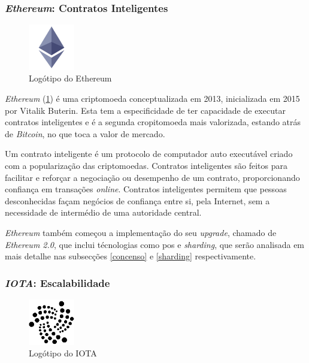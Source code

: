 \subsubsection{\textit{Ethereum}: Contratos Inteligentes}
\begin{figure}
    \includegraphics[width=2cm]{images/ethereum.png}
    \caption{Logótipo do Ethereum}
    \label{fig:ethereum-logo}
\end{figure}

\textit{Ethereum} (\cref{fig:ethereum-logo}) é uma criptomoeda conceptualizada em 2013, inicializada em 2015 por Vitalik Buterin. Esta tem a especificidade de ter capacidade de executar contratos inteligentes e é a segunda cropitomoeda mais valorizada, estando atrás de \textit{Bitcoin}, no que toca a valor de mercado. \cite{ethereum_wiki}

Um contrato inteligente é um protocolo de computador auto executável criado com a popularização das criptomoedas. Contratos inteligentes são feitos para facilitar e reforçar a negociação ou desempenho de um contrato, proporcionando confiança em transações \textit{online}. Contratos inteligentes permitem que pessoas desconhecidas façam negócios de confiança entre si, pela Internet, sem a necessidade de intermédio de uma autoridade central.

\textit{Ethereum} também começou a implementação do seu \textit{upgrade}, chamado de \textit{Ethereum 2.0}, que inclui  técnologias como \acrfull{pos} e \textit{sharding}, que serão analisada em mais detalhe nas subsecções \ref{concenso} e \ref{sharding} respectivamente. 

\subsubsection{\textit{IOTA}: Escalabilidade}

\begin{figure}
    \includegraphics[width=2cm]{images/iota.png}
    \caption{Logótipo do IOTA}
    \label{fig:iota-logo}
\end{figure}

